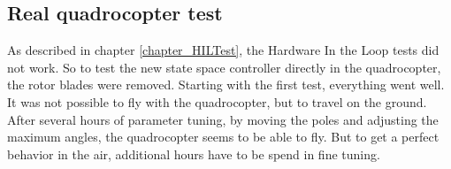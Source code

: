 \subsection{Real quadrocopter test}\label{chapter_RealCopterTest}

As described in chapter \ref{chapter_HILTest}, the Hardware In the Loop tests did not work. So to test the new state space controller directly in the quadrocopter, the rotor blades were removed. Starting with the first test, everything went well. It was not possible to fly with the quadrocopter, but to travel on the ground. After several hours of parameter tuning, by moving the poles and adjusting the maximum angles, the quadrocopter seems to be able to fly. But to get a perfect behavior in the air, additional hours have to be spend in fine tuning.   